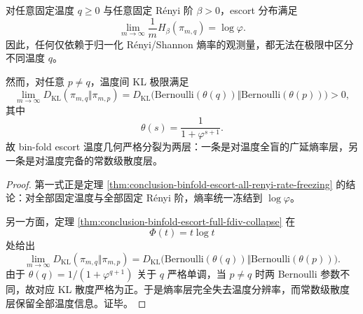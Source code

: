 \begin{theorem}[熵率全盲与常数级完备的正交分裂]\label{thm:conclusion-binfold-entropy-rate-blindness-vs-constant-completeness}
对任意固定温度 \(q\ge 0\) 与任意固定 Rényi 阶 \(\beta>0\)，escort 分布满足
\[
\lim_{m\to\infty}\frac{1}{m}H_\beta(\pi_{m,q})=\log\varphi.
\]
因此，任何仅依赖于归一化 Rényi/Shannon 熵率的观测量，都无法在极限中区分不同温度 \(q\)。

然而，对任意 \(p\neq q\)，温度间 KL 极限满足
\[
\lim_{m\to\infty}D_{\mathrm{KL}}(\pi_{m,q}\Vert \pi_{m,p})
=
D_{\mathrm{KL}}\!\bigl(\mathrm{Bernoulli}(\theta(q))\Vert \mathrm{Bernoulli}(\theta(p))\bigr)>0,
\]
其中
\[
\theta(s)=\frac{1}{1+\varphi^{s+1}}.
\]
故 bin-fold escort 温度几何严格分裂为两层：一条是对温度全盲的广延熵率层，另一条是对温度完备的常数级散度层。
\end{theorem}
\begin{proof}
第一式正是定理 \ref{thm:conclusion-binfold-escort-all-renyi-rate-freezing} 的结论：对全部固定温度与全部固定 Rényi 阶，熵率统一冻结到 \(\log\varphi\)。

另一方面，定理 \ref{thm:conclusion-binfold-escort-full-fdiv-collapse} 在
\[
\Phi(t)=t\log t
\]
处给出
\[
\lim_{m\to\infty}D_{\mathrm{KL}}(\pi_{m,q}\Vert \pi_{m,p})
=
D_{\mathrm{KL}}\!\bigl(\mathrm{Bernoulli}(\theta(q))\Vert \mathrm{Bernoulli}(\theta(p))\bigr).
\]
由于 \(\theta(q)=1/(1+\varphi^{q+1})\) 关于 \(q\) 严格单调，当 \(p\neq q\) 时两 Bernoulli 参数不同，故对应 KL 散度严格为正。于是熵率层完全失去温度分辨率，而常数级散度层保留全部温度信息。证毕。
\end{proof}

